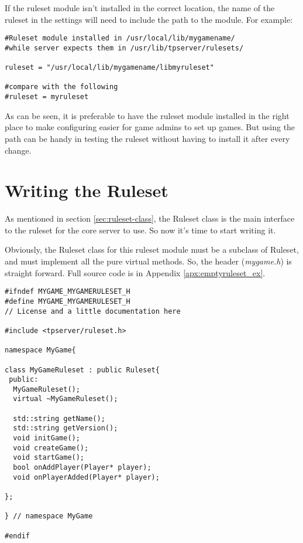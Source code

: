 \documentclass[a4paper,11pt]{report}
\newcommand{\filename}[1]{\emph{#1}}
\begin{document}
If the ruleset module isn't installed in the correct location, the name of the ruleset in the settings will need to include the path to the module. For example:

\begin{verbatim}
#Ruleset module installed in /usr/local/lib/mygamename/
#while server expects them in /usr/lib/tpserver/rulesets/

ruleset = "/usr/local/lib/mygamename/libmyruleset"

#compare with the following
#ruleset = myruleset
\end{verbatim}

As can be seen, it is preferable to have the ruleset module installed in the right place to make configuring easier for game admins to set up games. But using the path can be handy in testing the ruleset without having to install it after every change.

\chapter{Writing the Ruleset}
\label{chap:ruleset-writing}

As mentioned in section \ref{sec:ruleset-class}, the Ruleset class is the main interface to the ruleset for the core server to use. So now it's time to start writing it.

Obviously, the Ruleset class for this ruleset module must be a subclass of Ruleset, and must implement all the pure virtual methods. So, the header (\filename{mygame.h}) is straight forward. Full source code is in Appendix \ref{apx:emptyruleset_ex}.

\begin{verbatim}
#ifndef MYGAME_MYGAMERULESET_H
#define MYGAME_MYGAMERULESET_H
// License and a little documentation here

#include <tpserver/ruleset.h>

namespace MyGame{

class MyGameRuleset : public Ruleset{
 public:
  MyGameRuleset();
  virtual ~MyGameRuleset();

  std::string getName();
  std::string getVersion();
  void initGame();
  void createGame();
  void startGame();
  bool onAddPlayer(Player* player);
  void onPlayerAdded(Player* player);

};

} // namespace MyGame

#endif
\end{verbatim}
\end{document}
